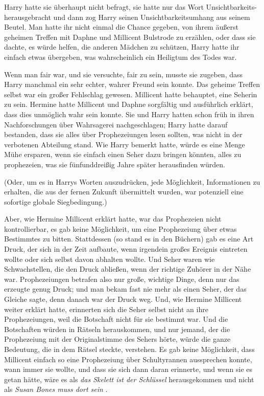 Harry hatte sie überhaupt nicht befragt, sie hatte nur das Wort \glqq
Unsichtbarkeits-\grqq{} herausgebracht und dann zog Harry seinen
Unsichtbarkeitsumhang aus seinem Beutel. Man hatte ihr nicht einmal die Chance
gegeben, von ihrem äußerst geheimen Treffen mit Daphne und Millicent Bulstrode
zu erzählen, oder dass sie dachte, es würde helfen, die anderen Mädchen zu
schützen, Harry hatte ihr einfach etwas übergeben, was wahrscheinlich ein
Heiligtum des Todes war.

Wenn man fair war, und sie versuchte, fair zu sein, musste sie zugeben, dass
Harry manchmal ein sehr echter, wahrer Freund sein konnte. Das geheime Treffen
selbst war ein großer Fehlschlag gewesen. Millicent hatte behauptet, eine
Seherin zu sein. Hermine hatte Millicent und Daphne sorgfältig und ausführlich
erklärt, dass dies unmöglich wahr sein konnte. Sie und Harry hatten schon früh
in ihren Nachforschungen über Wahrsagerei nachgeschlagen; Harry hatte darauf
bestanden, dass sie alles über Prophezeiungen lesen sollten, was nicht in der
verbotenen Abteilung stand. Wie Harry bemerkt hatte, würde es eine Menge Mühe
ersparen, wenn sie einfach einen Seher dazu bringen könnten, alles zu
prophezeien, was sie fünfunddreißig Jahre später herausfinden würden.

(Oder, um es in Harrys Worten auszudrücken, jede Möglichkeit, Informationen zu
erhalten, die aus der fernen Zukunft übermittelt wurden, war potenziell eine
sofortige globale Siegbedingung.)

Aber, wie Hermine Millicent erklärt hatte, war das Prophezeien nicht
kontrollierbar, es gab keine Möglichkeit, um eine Prophezeiung über etwas
Bestimmtes zu bitten. Stattdessen (so stand es in den Büchern) gab es eine Art
Druck, der sich in der Zeit aufbaute, wenn irgendein großes Ereignis eintreten
wollte oder sich selbst davon abhalten wollte. Und Seher waren wie
Schwachstellen, die den Druck abließen, wenn der richtige Zuhörer in der Nähe
war. Prophezeiungen betrafen also nur große, wichtige Dinge, denn nur das
erzeugte genug Druck; und man bekam fast nie mehr als einen Seher, der das
Gleiche sagte, denn danach war der Druck weg. Und, wie Hermine Millicent weiter
erklärt hatte, erinnerten sich die Seher selbst nicht an ihre Prophezeiungen,
weil die Botschaft nicht für sie bestimmt war. Und die Botschaften würden in
Rätseln herauskommen, und nur jemand, der die Prophezeiung mit der
Originalstimme des Sehers hörte, würde die ganze Bedeutung, die in dem Rätsel
steckte, verstehen. Es gab keine Möglichkeit, dass Millicent einfach so eine
Prophezeiung über Schultyrannen aussprechen konnte, wann immer sie wollte, und
dass sie sich dann daran erinnerte, und wenn sie es getan hätte, wäre es als
\emph{\glqq das Skelett ist der Schlüssel\grqq{} } herausgekommen und nicht als
\emph{\glqq Susan Bones muss dort sein\grqq{} }.

